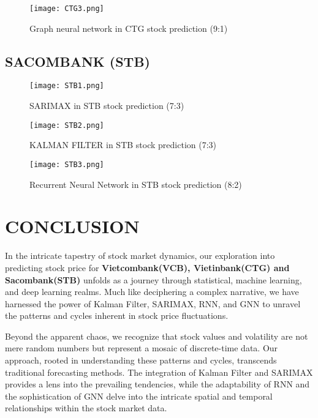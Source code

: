 \documentclass{ieeeojies}
\begin{document}
\begin{figure}[h]
  \centering
  \texttt{[image: CTG3.png]}
  \caption{Graph neural network in CTG stock prediction (9:1)}
  \label{fig:example}
\end{figure}


\vspace{10em}
\subsection{SACOMBANK (STB)}
\begin{figure}[ht]
  \centering
  \texttt{[image: STB1.png]}
  \caption{SARIMAX in STB stock prediction (7:3)}
  \label{fig:example}
  
\end{figure}

\begin{figure}[ht]
  \centering
  \texttt{[image: STB2.png]}
  \caption{KALMAN FILTER in STB stock prediction (7:3)}
  \label{fig:example}
  \centering
  \texttt{[image: STB3.png]}
  \caption{Recurrent Neural Network in STB stock prediction (8:2)}
  \label{fig:example}
  
\end{figure}



\vspace{20mm}
\section{CONCLUSION}
In the intricate tapestry of stock market dynamics, our exploration into predicting stock price for \textbf{Vietcombank(VCB), Vietinbank(CTG) and Sacombank(STB)} unfolds as a journey through statistical, machine learning, and deep learning realms. Much like deciphering a complex narrative, we have harnessed the power of Kalman Filter, SARIMAX, RNN, and GNN to unravel the patterns and cycles inherent in stock price fluctuations.

Beyond the apparent chaos, we recognize that stock values and volatility are not mere random numbers but represent a mosaic of discrete-time data. Our approach, rooted in understanding these patterns and cycles, transcends traditional forecasting methods. The integration of Kalman Filter and SARIMAX provides a lens into the prevailing tendencies, while the adaptability of RNN and the sophistication of GNN delve into the intricate spatial and temporal relationships within the stock market data.
\end{document}
